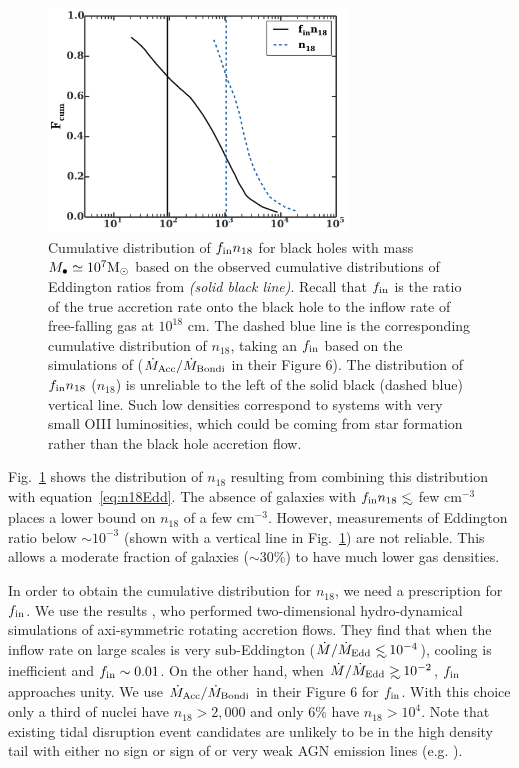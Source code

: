 \documentclass[usenatbib,fleqn]{mnras}
\newcommand\lsim{\mathrel{\rlap{\lower4pt\hbox{\hskip1pt$\sim$}}
    \raise1pt\hbox{$<$}}}
\newcommand\gsim{\mathrel{\rlap{\lower4pt\hbox{\hskip1pt$\sim$}}
    \raise1pt\hbox{$>$}}}
\newcommand{\Mbh}[1][]{M_{\bullet#1}}
\newcommand{\Msun}{{\rm M_\odot}}
\begin{document}
\begin{figure}
\includegraphics[width=8cm]{fcum_n18.pdf}
\caption{\label{fig:n18Cum} Cumulative distribution of $f_{\rm in}
  n_{18}$ for black holes with mass $\Mbh\simeq 10^{7} \Msun$ based on
  the observed cumulative distributions of Eddington ratios from
  \citet{Kauffmann&Heckman2009} {\it (solid black line)}. Recall that
  $f_{\rm in}$ is the ratio of the true accretion rate onto the black
  hole to the inflow rate of free-falling gas at $10^{18}$ cm.  The
  dashed blue line is the corresponding cumulative distribution of
  $n_{18}$, taking an $f_{\rm in}$ based on the simulations of
  \citet{Li+2013} ($\dot{M}_{\rm Acc}/\dot{M}_{\rm Bondi}$ in their
  Figure 6). The distribution of $f_{\rm in} n_{18}$ ($n_{18}$) is
  unreliable to the left of the solid black (dashed blue) vertical
  line. Such low densities correspond to systems with very small OIII
  luminosities, which could be coming from star formation rather than
  the black hole accretion flow.}
\end{figure}


Fig.~\ref{fig:n18Cum} shows the distribution of $n_{18}$ resulting
from combining this distribution with equation~\eqref{eq:n18Edd}.  The
absence of galaxies with $f_{\rm in }n_{18} \lsim$ few cm$^{-3}$
places a lower bound on $n_{18}$ of a few cm$^{-3}$.  However,
measurements of Eddington ratio below $\sim 10^{-3}$ (shown with a
vertical line in Fig.~\ref{fig:n18Cum}) are not reliable. This allows a
moderate fraction of galaxies ($\sim 30\%$) to have much lower gas
densities.


In order to obtain the cumulative distribution for $n_{18}$, we need a
prescription for $f_{\rm in}$. We use the results \citet{Li+2013}, who
performed two-dimensional hydro-dynamical simulations of axi-symmetric
rotating accretion flows. They find that when the inflow rate on large
scales is very sub-Eddington ($\dot{M}/\dot{M}_{\rm Edd} \lsim
10^{-4}$), cooling is inefficient and $f_{\rm in}\sim
0.01$. On the other hand, when $\dot{M}/\dot{M}_{\rm Edd}\gsim
10^{-2}$, $f_{\rm in}$ approaches unity.  We use $\dot{M}_{\rm
  Acc}/\dot{M}_{\rm Bondi}$ in their Figure 6 for $f_{\rm in}$.  With
this choice only a third of nuclei have $n_{18}>2,000$ and only 6\%
have $n_{18}>10^{4}$. Note that existing tidal disruption event
candidates are unlikely to be in the high density tail with either no
sign or sign of or very weak AGN emission lines
(e.g. \citealt{van-Velzen+2011, Arcavi+2014}).
\end{document}

